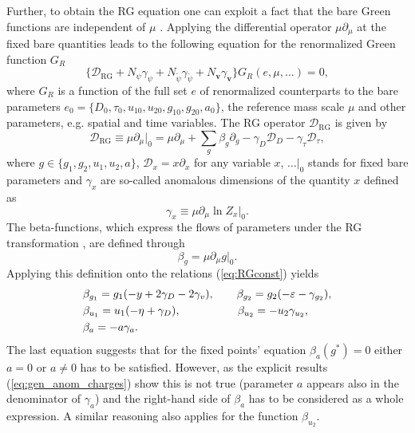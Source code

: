 \documentclass[aps,pre,url,twocolumn,superscriptaddress]{revtex4-1}
\def\eps{\varepsilon}
\def\mv{{\bm v}}
\def\D{\mathcal{D}}
\begin{document}
Further, to obtain the RG equation one can exploit a fact that the bare Green functions
are independent 
of $\mu$ \cite{Amit}.
Applying the differential operator $\mu\partial_\mu$ at the fixed bare quantities leads to
 the following equation for the renormalized Green function $G_R$ 
\begin{equation}
  \{ \D_{\text{RG}} + N_{\psi} \gamma_{\psi} +
   N_{\tilde{\psi}} \gamma_{\tilde{\psi}} +N_\mv \gamma_{\mv}  \} 
  G_R(e, \mu, \dots)=0,
  \label{eq:basic_RG}
\end{equation}
where $G_R$ is a function of the full set  $e$ of renormalized counterparts to the bare
 parameters $e_0 =\{D_0, \tau_0, u_{10},u_{20}, g_{10}, g_{20}, a_0 \}$,
 the reference mass scale $\mu$ and other parameters, e.g. spatial and time variables. 
 The RG operator $\D_{\text{RG}}$ is given by
\begin{equation}
   \D_{\text{RG}}\equiv \mu\partial_\mu|_0  = \mu \partial_{\mu} + 
            \sum_{g} \beta_g \partial_g 
	    - \gamma_D \D_D - \gamma_{\tau} \D_{\tau},
   \label{eq:RG_equation}	    
\end{equation}
where $g\in\{g_1,g_2,u_1,u_2,a \}$, $\D_x = x \partial_x$ for any variable $x$, $\dots|_0$
stands for fixed bare parameters
and $\gamma_x$ are so-called anomalous dimensions of the quantity $x$  defined as 
\begin{equation}
  \label{eq:def_gamma}
  \gamma_x \equiv \mu\partial_\mu \ln  Z_x |_0.
\end{equation}
The beta-functions, which express the flows of parameters under the RG 
transformation \cite{Amit}, are defined through
\begin{equation}
  \label{eq:def_beta}
  \beta_g = \mu \partial_{\mu} g |_{0}.  %
\end{equation}
Applying %
this definition onto the relations (\ref{eq:RGconst}) yields
\begin{align}
  & \beta_{g_1} = g_1 (-y + 2\gamma_D-2\gamma_v), \qquad
      \beta_{g_2} = g_2 (-\eps -\gamma_{g_2}), \nonumber \\
  & \beta_{u_1} = u_1(-\eta +\gamma_D), \hskip1.8cm
      \beta_{u_2} = - u_2 \gamma_{u_2}, \nonumber \\
  & \beta_{a} = - a \gamma_{a}.
  \label{eq:beta_functions}
\end{align}
The last equation suggests that for the fixed points' equation
$\beta_a(g^*) = 0$ either $a=0$ or $a\neq 0$ has to be satisfied. However, as the
explicit results (\ref{eq:gen_anom_charges}) show this is not true (parameter
$a$ appears also in the denominator of $\gamma_a$) and 
the right-hand side of $\beta_a$ has to be considered as a whole expression.
 A similar reasoning also applies for the function $\beta_{u_2}$.
 
\end{document}
